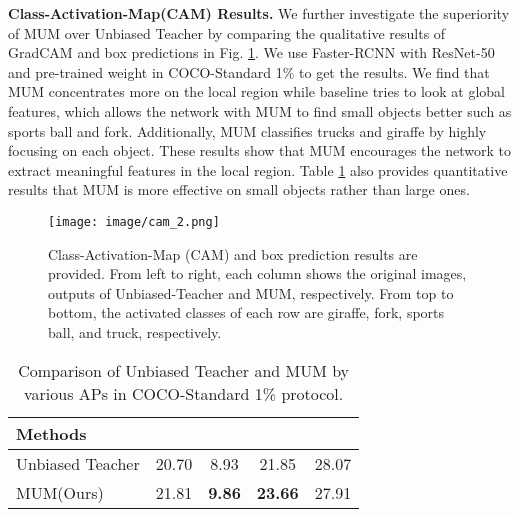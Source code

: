 \documentclass[10pt,twocolumn,letterpaper]{article}
\begin{document}
\noindent \textbf{Class-Activation-Map(CAM) Results.}
We further investigate the superiority of MUM over Unbiased Teacher by comparing the qualitative results of GradCAM\cite{selvaraju2017grad} and box predictions in Fig. \ref{fig:cam}.
We use Faster-RCNN with ResNet-50 and pre-trained weight in COCO-Standard 1\% to get the results.
We find that MUM concentrates more on the local region while baseline tries to look at global features, which allows the network with MUM to find small objects better such as sports ball and fork.
Additionally, MUM classifies trucks and giraffe by highly focusing on each object.
These results show that MUM encourages the network to extract meaningful features in the local region.
Table \ref{tab:size} also provides quantitative results that MUM is more effective on small objects rather than large ones.

\begin{figure}[t!] \texttt{[image: image/cam\_2.png]}
\caption{Class-Activation-Map (CAM) and box prediction results are provided. 
From left to right, each column shows the original images, outputs of Unbiased-Teacher and MUM, respectively.
From top to bottom, the activated classes of each row are giraffe, fork, sports ball, and truck, respectively.}
\label{fig:cam}
\end{figure} 

\begin{table}
\caption{Comparison of Unbiased Teacher and MUM by various APs in COCO-Standard 1\% protocol.}
\centering
{}
{
\begin{tabular}{|l|cccc|}
\hline
Methods          &  &   &    &    \\ \hline
Unbiased Teacher\cite{liu2021unbiased} &  20.70             & 8.93  & 21.85 & 28.07 \\
MUM(Ours)              & 21.81              & \textbf{9.86} & \textbf{23.66} & 27.91\\ \hline
\end{tabular}
}
\label{tab:size}
\end{table}
\end{document}
